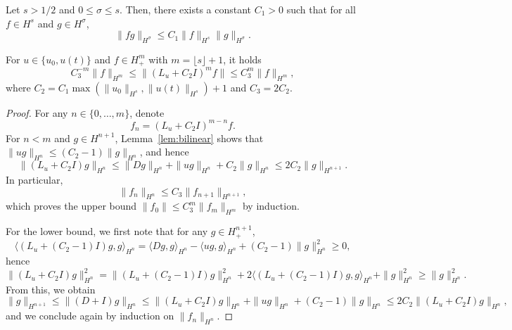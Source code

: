 \documentclass[10pt,a4paper]{amsart}
\begin{document}
\begin{lem}
\label{lem:bilinear}
Let $s> 1/2$ and $0\le\sigma\leq s$. Then, there exists a constant $C_1 > 0$ such that for all $f\in H^s$ and $g\in H^\sigma$,
\[
\|fg\|_{H^\sigma}\leq C_1\|f\|_{H^s}\|g\|_{H^\sigma}.
\]
\end{lem}

\begin{lem}
\label{lem:LuplusC2}
For $u\in \{u_0,u(t)\}$ and $f\in H^{m}_+$ with $m=\lfloor s\rfloor+1$, it holds
\[
C_3^{-m}\|f\|_{H^{m}}\leq \|(L_u+C_2 I)^mf\| \leq C_3^m \|f\|_{H^{m}},
\]
where $C_2=C_1\max(\|u_0\|_{H^s},\|u(t)\|_{H^s})+1$ and $C_3=2C_2$.
\end{lem}

\begin{proof}
For any $n\in\{0,\dots,m\}$, denote
\[
f_n=(L_u+C_2 I)^{m-n}f.
\]
For $n<m$ and $g\in H^{n+1}$, Lemma~\ref{lem:bilinear} shows that $\|ug\|_{H^{n}}\leq (C_2-1)\|g\|_{H^n}$, and hence
\[
\|(L_u+C_2 I)g\|_{H^{n}}\leq \|Dg\|_{H^{n}}+\|ug\|_{H^{n}}+C_2\|g\|_{H^{n}}\leq 2C_2\|g\|_{H^{n+1}}.
\]
In particular,
\[
\|f_n\|_{H^n}\leq C_3\|f_{n+1}\|_{H^{n+1}},
\]
which proves the upper bound $\|f_0\|\leq C_3^m \|f_m\|_{H^{m}}$ by induction.
\newline

For the lower bound, we first note that for any $g\in H^{n+1}_+$,
\[
\langle(L_u+(C_2-1)I)g,g\rangle_{H^n} = \langle D g,g\rangle_{H^n} -\langle ug,g\rangle_{H^n}+(C_2-1)\|g\|_{H^n}^2\geq 0,
\]
hence
\[
\|(L_u+C_2I)g\|_{H^{n}}^2=\|(L_u+(C_2-1)I)g\|_{H^{n}}^2+2\langle(L_u+(C_2-1)I)g,g\rangle_{H^n} +\|g\|_{H^n}^2\geq \|g\|_{H^n}^2.
\]
From this, we obtain
\[
\|g\|_{H^{n+1}}\leq \|(D+I)g\|_{H^n}\leq \|(L_u+C_2I)g\|_{H^{n}}+\|ug\|_{H^{n}}+(C_2-1)\|g\|_{H^{n}}\leq 2C_2\|(L_u+C_2 I)g\|_{H^{n}},
\]
and we conclude again by induction on $\|f_n\|_{H^n}$.
\end{proof}
\end{document}
